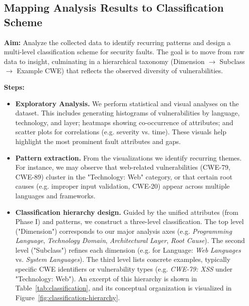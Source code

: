 \subsection{Mapping Analysis Results to Classification Scheme} \textbf{Aim:} Analyze the collected data to identify recurring patterns and design a multi-level classification scheme for security faults. The goal is to move from raw data to insight, culminating in a hierarchical taxonomy (Dimension $\rightarrow$ Subclass $\rightarrow$ Example CWE) that reflects the observed diversity of vulnerabilities.
\newline

\textbf{Steps:}
\begin{itemize}
    \item \textbf{Exploratory Analysis.} We perform statistical and visual analyses on the dataset. This includes generating histograms of vulnerabilities by language, technology, and layer; heatmaps showing co-occurrence of attributes; and scatter plots for correlations (e.g. severity vs. time). These visuals help highlight the most prominent fault attributes and gaps.
    \item \textbf{Pattern extraction.} From the visualizations we identify recurring themes. For instance, we may observe that web-related vulnerabilities (CWE-79, CWE-89) cluster in the "Technology: Web" category, or that certain root causes (e.g. improper input validation, CWE-20) appear across multiple languages and frameworks.
    \item \textbf{Classification hierarchy design.} Guided by the unified attributes (from Phase I) and patterns, we construct a three-level classification. The top level ("Dimension") corresponds to our major analysis axes (e.g. {\em Programming Language}, {\em Technology Domain}, {\em Architectural Layer}, {\em Root Cause}). The second level ("Subclass") refines each dimension (e.g. for Language: {\em Web Languages} vs. {\em System Languages}). The third level lists concrete examples, typically specific CWE identifiers or vulnerability types (e.g. {\em CWE-79: XSS} under "Technology: Web"). An excerpt of this hierarchy is shown in Table~\ref{tab:classification}, and its conceptual organization is visualized in Figure~\ref{fig:classification-hierarchy}.
\end{itemize}

